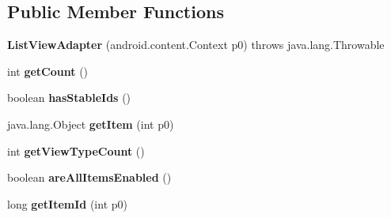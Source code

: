 \subsection*{Public Member Functions}
\begin{DoxyCompactItemize}
\item 
\mbox{\label{classmd5b60ffeb829f638581ab2bb9b1a7f4f3f_1_1ListViewAdapter_a05870e24bde7dafbf3a32f91e03545d9}} 
{\bfseries List\+View\+Adapter} (android.\+content.\+Context p0)  throws java.\+lang.\+Throwable 	
\item 
\mbox{\label{classmd5b60ffeb829f638581ab2bb9b1a7f4f3f_1_1ListViewAdapter_a9f24848499759eacb32669883ca93995}} 
int {\bfseries get\+Count} ()
\item 
\mbox{\label{classmd5b60ffeb829f638581ab2bb9b1a7f4f3f_1_1ListViewAdapter_af602626fd68dbd7b7b5f21f077d0a303}} 
boolean {\bfseries has\+Stable\+Ids} ()
\item 
\mbox{\label{classmd5b60ffeb829f638581ab2bb9b1a7f4f3f_1_1ListViewAdapter_a73d2d62a8f9f049e63781a1a8f96b232}} 
java.\+lang.\+Object {\bfseries get\+Item} (int p0)
\item 
\mbox{\label{classmd5b60ffeb829f638581ab2bb9b1a7f4f3f_1_1ListViewAdapter_ad3f6189cd42d626e244ac54ad5afdc10}} 
int {\bfseries get\+View\+Type\+Count} ()
\item 
\mbox{\label{classmd5b60ffeb829f638581ab2bb9b1a7f4f3f_1_1ListViewAdapter_a2c591a49427e11f184e70d0db0678c5d}} 
boolean {\bfseries are\+All\+Items\+Enabled} ()
\item 
\mbox{\label{classmd5b60ffeb829f638581ab2bb9b1a7f4f3f_1_1ListViewAdapter_a9bf248f34b601de71eb45468af4d5230}} 
long {\bfseries get\+Item\+Id} (int p0)
\item 
\mbox{\label{classmd5b60ffeb829f638581ab2bb9b1a7f4f3f_1_1ListViewAdapter_ac49d0d79db395817151bc8bb649e6a4f}} 

\end{DoxyCompactItemize}
